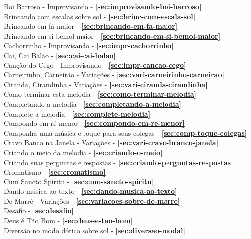 Boi Barroso - Improvisando - \textbf{\ref{sec:improvisando-boi-barroso}} \\
Brincando com escalas sobre sol - \textbf{\ref{sec:brinc-com-escala-sol}} \\
Brincando em fá maior - \textbf{\ref{sec:brincando-em-fa-maior}} \\
Brincando em si bemol maior - \textbf{\ref{sec:brincando-em-si-bemol-maior}} \\
Cachorrinho - Improvisando - \textbf{\ref{sec:impr-cachorrinho}} \\
Cai, Cai Balão - \textbf{\ref{sec:cai-cai-balao}} \\
Canção do Cego - Improvisando - \textbf{\ref{sec:impr-cancao-cego}} \\
Carneirinho, Carneirão - Variações - \textbf{\ref{sec:vari-carneirinho-carneirao}} \\
Ciranda, Cirandinha - Variações - \textbf{\ref{sec:vari-ciranda-cirandinha}} \\
Como terminar esta melodia - \textbf{\ref{sec:como-terminar-melodia}} \\
Completando a melodia - \textbf{\ref{sec:completando-a-melodia}} \\
Complete a melodia - \textbf{\ref{sec:complete-melodia}} \\
Compondo em ré menor - \textbf{\ref{sec:compondo-em-re-menor}} \\
Componha uma música e toque para seus colegas - \textbf{\ref{sec:comp-toque-colegas}} \\
Cravo Banco na Janela - Variações - \textbf{\ref{sec:vari-cravo-branco-janela}} \\
Criando o meio da melodia - \textbf{\ref{sec:criando-o-meio}} \\
Criando suas perguntas e respostas - \textbf{\ref{sec:criando-perguntas-respostas}} \\
Cromatismo - \textbf{\ref{sec:cromatismo}} \\
Cum Sancto Spiritu - \textbf{\ref{sec:cum-sancto-spiritu}} \\
Dando música ao texto - \textbf{\ref{sec:dando-musica-ao-texto}} \\
De Marré - Variações - \textbf{\ref{sec:variacoes-sobre-de-marre}} \\
Desafio - \textbf{\ref{sec:desafio}} \\
Deus é Tão Bom - \textbf{\ref{sec:deus-e-tao-bom}} \\
Diversão no modo dórico sobre sol - \textbf{\ref{sec:diversao-modal}} \\
